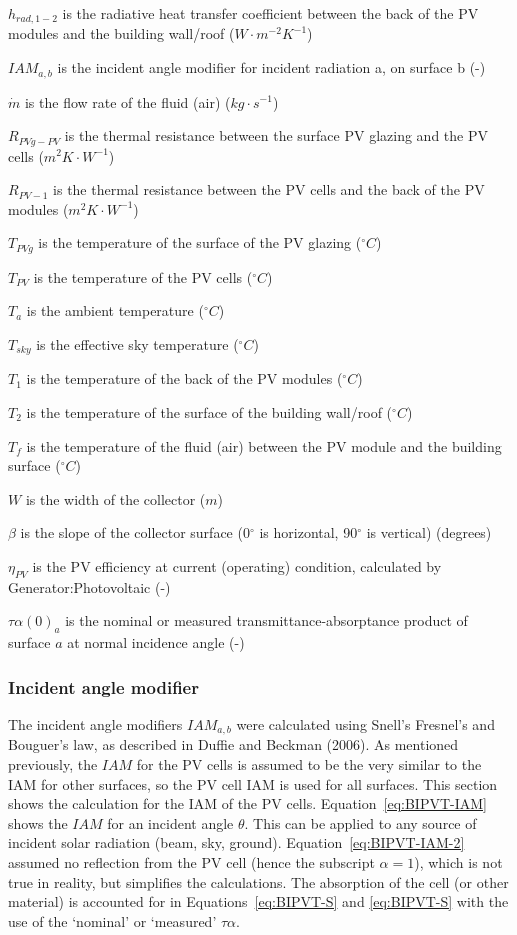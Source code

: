 \(h_{rad,1-2}\) is the radiative heat transfer coefficient between the back of the PV modules and the building wall/roof (\(W\cdot m^{-2}K^{-1}\))

\(IAM_{a,b}\) is the incident angle modifier for incident radiation a, on surface b (-)

\(\dot{m}\) is the flow rate of the fluid (air) (\(kg\cdot s^{-1}\))

\(R_{PVg-PV}\) is the thermal resistance between the surface PV glazing and the PV cells (\(m^{2}K\cdot W^{-1}\))

\(R_{PV-1}\) is the thermal resistance between the PV cells and the back of the PV modules (\(m^{2}K\cdot W^{-1}\))

\(T_{PVg}\) is the temperature of the surface of the PV glazing (\(^{\circ}C\))

\(T_{PV}\) is the temperature of the PV cells (\(^{\circ}C\))

\(T_{a}\) is the ambient temperature (\(^{\circ}C\))

\(T_{sky}\) is the effective sky temperature (\(^{\circ}C\))

\(T_{1}\) is the temperature of the back of the PV modules (\(^{\circ}C\))

\(T_{2}\) is the temperature of the surface of the building wall/roof (\(^{\circ}C\))

\(T_{f}\) is the temperature of the fluid (air) between the PV module and the building surface (\(^{\circ}C\))

\(W\) is the width of the collector (\(m\))

\(\beta\) is the slope of the collector surface (0\(^{\circ}\) is horizontal, 90\(^{\circ}\) is vertical) (degrees)

\(\eta_{PV}\) is the PV efficiency at current (operating) condition, calculated by Generator:Photovoltaic (-)

\(\tau\alpha (0)_{a}\) is the nominal or measured transmittance-absorptance product of surface \(a\) at normal incidence angle (-)

\subsubsection{Incident angle modifier}\label{BIPVT-IAM}

The incident angle modifiers \(IAM_{a,b}\) were calculated using Snell's Fresnel's and Bouguer's law, as described in Duffie and Beckman (2006). As mentioned previously, the \(IAM\) for the PV cells is assumed to be the very similar to the IAM for other surfaces, so the PV cell IAM is used for all surfaces. This section shows the calculation for the IAM of the PV cells. Equation~\ref{eq:BIPVT-IAM} shows the \(IAM\) for an incident angle \(\theta\). This can be applied to any source of incident solar radiation (beam, sky, ground). Equation~\ref{eq:BIPVT-IAM-2} assumed no reflection from the PV cell (hence the subscript \(\alpha=1\)), which is not true in reality, but simplifies the calculations. The absorption of the cell (or other material) is accounted for in Equations~\ref{eq:BIPVT-S} and \ref{eq:BIPVT-S} with the use of the `nominal' or `measured' \(\tau\alpha\).

